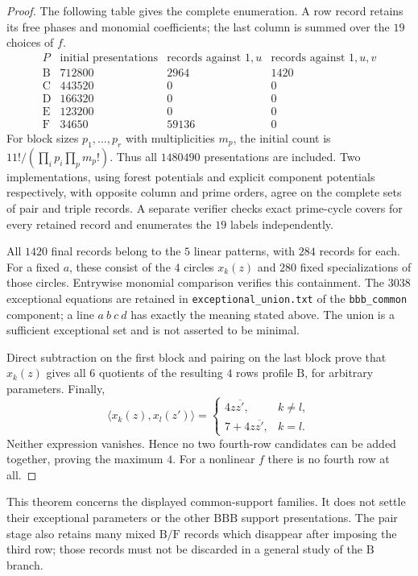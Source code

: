 \documentclass[11pt,a4paper]{article}
\theoremstyle{plain}
\theoremstyle{definition}
\theoremstyle{plain}
\begin{document}
\begin{proof}
The following table gives the complete enumeration. A row record retains its free phases and monomial coefficients; the last column is summed over the $19$ choices of $f$.
$$\begin{array}{c|r|r|r}
P&\text{initial presentations}&\text{records against }1,u&\text{records against }1,u,v\\\hline
\mathrm{B}&712800&2964&1420\\
\mathrm{C}&443520&0&0\\
\mathrm{D}&166320&0&0\\
\mathrm{E}&123200&0&0\\
\mathrm{F}&34650&59136&0
\end{array}$$
For block sizes $p_1,\ldots,p_r$ with multiplicities $m_p$, the initial count is $11!/(\prod_i p_i\prod_p m_p!)$. Thus all $1480490$ presentations are included. Two implementations, using forest potentials and explicit component potentials respectively, with opposite column and prime orders, agree on the complete sets of pair and triple records. A separate verifier checks exact prime-cycle covers for every retained record and enumerates the $19$ labels independently.

All $1420$ final records belong to the $5$ linear patterns, with $284$ records for each. For a fixed $a$, these consist of the $4$ circles $x_k(z)$ and $280$ fixed specializations of those circles. Entrywise monomial comparison verifies this containment. The $3038$ exceptional equations are retained in \texttt{exceptional\_union.txt} of the \texttt{bbb\_common} component; a line $a\ b\ c\ d$ has exactly the meaning stated above. The union is a sufficient exceptional set and is not asserted to be minimal.

Direct subtraction on the first block and pairing on the last block prove that $x_k(z)$ gives all $6$ quotients of the resulting $4$ rows profile $\mathrm{B}$, for arbitrary parameters. Finally,
$$\langle x_k(z),x_l(z')\rangle=
\begin{cases}
4z\overline{z'},&k\ne l,\\
7+4z\overline{z'},&k=l.
\end{cases}$$
Neither expression vanishes. Hence no two fourth-row candidates can be added together, proving the maximum $4$. For a nonlinear $f$ there is no fourth row at all.
\end{proof}

This theorem concerns the displayed common-support families. It does not settle their exceptional parameters or the other $\mathrm{BBB}$ support presentations. The pair stage also retains many mixed $\mathrm{B}/\mathrm{F}$ records which disappear after imposing the third row; those records must not be discarded in a general study of the $\mathrm{B}$ branch.
\end{document}
